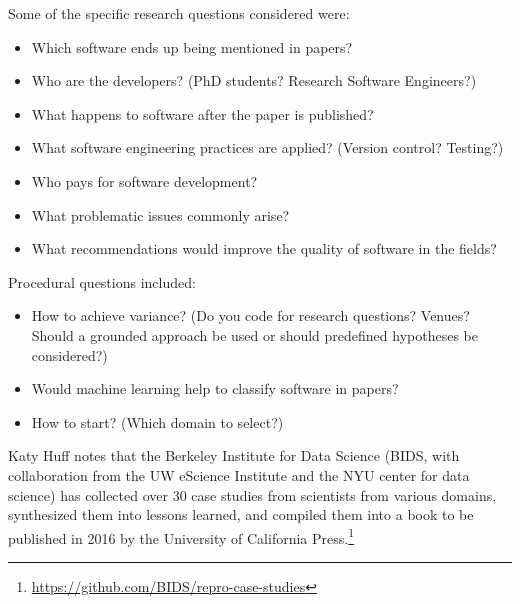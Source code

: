 \documentclass[a4paper,UKenglish]{dagrep}
\begin{document}
Some of the specific research questions considered were:
\begin{itemize}
\item Which software ends up being mentioned in papers?
\item Who are the developers? (PhD students? Research Software Engineers?)
\item What happens to software after the paper is published?
\item What software engineering practices are applied? (Version control? Testing?)
\item Who pays for software development?
\item What problematic issues commonly arise?
\item What recommendations would improve the quality of software in the fields?
\end{itemize}

Procedural questions included:
\begin{itemize}
\item How to achieve variance? (Do you code for research questions? Venues? Should a grounded approach be used or should predefined hypotheses be considered?)
\item Would machine learning help to classify software in papers?
\item How to start? (Which domain to select?)
\end{itemize}

Katy Huff notes that the Berkeley Institute for Data Science (BIDS, with collaboration from the UW eScience Institute and the NYU center for data science) has collected over 30 case studies from scientists from various domains, synthesized them into lessons learned, and compiled them into a book to be published in 2016 by the University of California Press.\footnote{\url{https://github.com/BIDS/repro-case-studies}}





\end{document}
